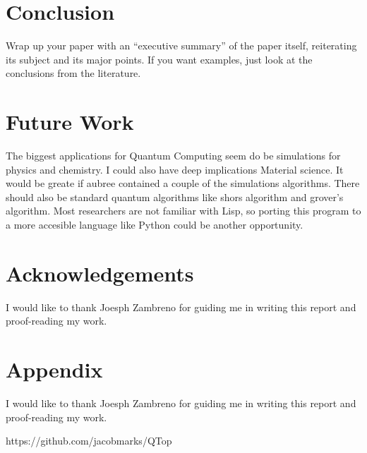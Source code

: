 \documentclass{article}
\begin{document}
\section{Conclusion}

Wrap up your paper with an ``executive summary'' of the paper itself, reiterating its subject and its major points.  If you want examples, just look at the conclusions from the literature.

\section{Future Work}
The biggest applications for Quantum Computing seem do be simulations for physics and chemistry. I could also have deep implications Material science. It would be greate if aubree contained a couple of the simulations algorithms. There should also be standard quantum algorithms like shors algorithm and grover's algorithm. Most researchers are not familiar with Lisp, so porting this program to a more accesible language like Python could be another opportunity.


\section{Acknowledgements}
I would like to thank Joesph Zambreno for guiding me in writing this report and proof-reading my work.

\section{Appendix}
I would like to thank Joesph Zambreno for guiding me in writing this report and proof-reading my work.






https://github.com/jacobmarks/QTop
\end{document}
